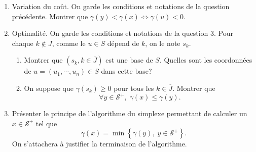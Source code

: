 \begin{enumerate}
  \item Variation du coût. On garde les conditions et notations de la question précédente.\newline
Montrer que $\gamma(y) < \gamma(x) \Leftrightarrow \gamma(u) < 0$.
 
   \item Optimalité. On garde les conditions et notations de la question 3.\newline
   Pour chaque $k \notin J$, comme le $u \in S$ dépend de $k$, on le note $s_k$.
   \begin{enumerate}
     \item Montrer que $\left(s_k , k \in \overline{J}\right)$ est une base de $S$. Quelles sont les coordonnées de $u=(u_1, \cdots,u_n)\in S$ dans cette base?
     \item On suppose que $\gamma(s_k)\geq 0$ pour tous les $k \in \overline{J}$. Montrer que 
     \[
       \forall y \in \mathcal{S}^+, \; \gamma(x) \leq \gamma(y).
     \]
   \end{enumerate}
  \item Présenter le principe de l'algorithme du simplexe permettant de calculer un $x\in \mathcal{S}^+$ tel que 
\[
  \gamma(x) = \min\left\lbrace \gamma(y),\; y \in \mathcal{S}^+ \right\rbrace.
\]
  On s'attachera à justifier la terminaison de l'algorithme.
\end{enumerate}

